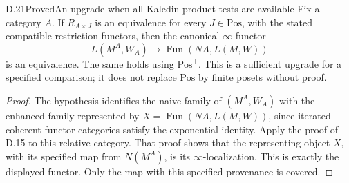 \begin{result}{D.21}{Proved}{An upgrade when all Kaledin product tests are available}
Fix a category $A$. If $R_{A\times J}$ is an equivalence for every
$J\in\mathrm{Pos}$, with the stated compatible restriction
functors, then the canonical $\infty$-functor
\[
 L(M^A,W_A)\longrightarrow
       \operatorname{Fun}(NA,L(M,W))
\]
is an equivalence. The same holds using $\mathrm{Pos}^{+}$.
This is a sufficient upgrade for a specified comparison; it does
not replace $\mathrm{Pos}$ by finite posets without proof.
\end{result}
\begin{proof}
The hypothesis identifies the naive family of $(M^A,W_A)$ with
the enhanced family represented by
$X=\operatorname{Fun}(NA,L(M,W))$, since iterated coherent functor
categories satisfy the exponential identity. Apply the proof of
D.15 to this relative category. That proof shows that the
representing object $X$, with its specified map from $N(M^A)$,
is its $\infty$-localization. This is exactly the displayed
functor. Only the map with this specified provenance is covered.
\end{proof}

